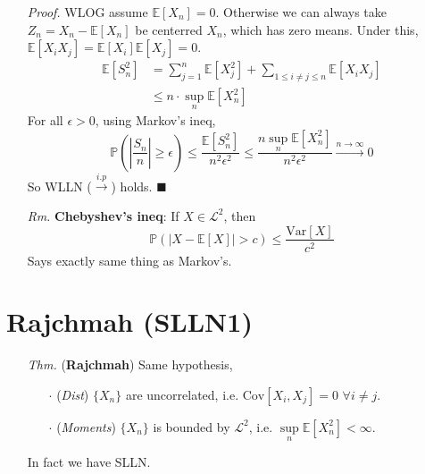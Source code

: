 \documentclass[a4paper,12pt,twoside]{book}
\begin{document}
\begin{itemize}
	\item[\textit{Proof.}] WLOG assume $\mathbb{E}\left[X_n\right]=0$. \newline
	Otherwise we can always take $Z_n = X_n - \mathbb{E}\left[X_n\right]$ be centerred $X_n$, which has zero means. Under this, $\mathbb{E}\left[X_iX_j\right]=\mathbb{E}\left[X_i\right]\mathbb{E}\left[X_j\right]=0$. \newline
	\begin{equation}
		\begin{split}
			\mathbb{E}\left[S_n^2\right]&=\sum_{j=1}^n \mathbb{E}\left[X_j^2\right]+\sum_{1\leq i\ne j\leq n} \mathbb{E}\left[X_iX_j\right]\\
			&\leq n\cdot \sup\limits_{n} \mathbb{E}\left[X^2_n\right]
		\end{split}
	\end{equation}
	For all $\epsilon >0$, using Markov's ineq,
	\begin{equation}
		\mathbb{P}\left(\left|\frac{S_n}{n}\right|\geq \epsilon\right)\leq \frac{\mathbb{E}\left[S_n^2\right]}{n^2\epsilon^2}\leq \frac{n \sup\limits_{n} \mathbb{E}\left[X^2_n\right]}{n^2 \epsilon^2} \xrightarrow{n\to \infty}0
	\end{equation}
	So WLLN ($\xrightarrow{i.p}$) holds. $\blacksquare$ 

	\item[\textit{Rm.}] \textbf{Chebyshev's ineq}: If $X\in \mathcal{L}^2$, then 
	\begin{equation}
		\mathbb{P}\left(|X- \mathbb{E}\left[X\right]|>c\right)\leq \frac{\mathrm{Var}\left[X\right]}{c^2}
	\end{equation}
	Says exactly same thing as Markov's. 
\end{itemize}


\section{Rajchmah (SLLN1)}
\begin{itemize}
	\item[\textit{Thm.}] (\textbf{Rajchmah}) Same hypothesis,
	\begin{itemize}
		\item[$\cdot$] (\textit{Dist}) $\{X_n\}$ are uncorrelated, i.e. $\mathrm{Cov}\left[X_i, X_j\right]=0$ $\forall i\ne j$.
		\item[$\cdot$] (\textit{Moments}) $\{X_n\}$ is bounded by $\mathcal{L}^2$, i.e. $\sup\limits_{n}\mathbb{E}\left[X^2_n\right]< \infty$.
	\end{itemize}
	In fact we have SLLN.
\end{itemize}
\end{document}
